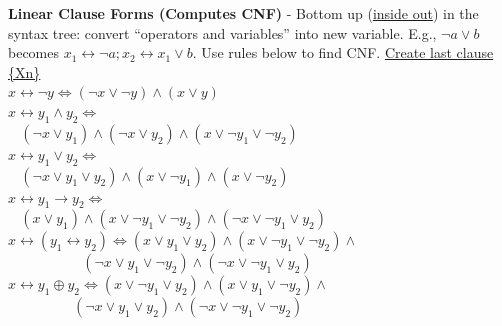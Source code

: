 \documentclass{article}
\begin{document}
\begin{multicols}{4}
\textbf{Linear Clause Forms (Computes CNF)} - Bottom up (\underline{inside out}) in the syntax tree: convert “operators and variables” into new variable.
E.g., $\neg a \vee b$ becomes $x_1 \leftrightarrow \neg a; x_2 \leftrightarrow x_1 \vee b$. Use rules below to find CNF. \underline{Create last clause \{Xn\}} \\
$x \leftrightarrow \neg y  \Leftrightarrow (\neg x \vee \neg y) \wedge (x \vee y)$ \\
$x \leftrightarrow y_1 \wedge y_2 \Leftrightarrow$ \\
$\ \ \ \ (\neg x \vee y_1) \wedge (\neg x \vee y_2) \wedge (x \vee \neg y_1 \vee \neg y_2)$ \\
$x \leftrightarrow y_1 \vee y_2 \Leftrightarrow$ \\
$\ \ \ \ (\neg x \vee y_1 \vee y_2) \wedge ( x \vee \neg y_1) \wedge (x \vee \neg y_2)$ \\
$x \leftrightarrow y_1 \rightarrow y_2 \Leftrightarrow$ \\
$\ \ \ \ (x \vee y_1) \wedge ( x \vee \neg y_1 \vee \neg y_2) \wedge (\neg x \vee \neg y_1 \vee y_2)$ \\
$x \leftrightarrow (y_1 \leftrightarrow y_2) \Leftrightarrow (x \vee y_1 \vee y_2) \wedge (x \vee \neg y_1 \vee \neg y_2) \wedge$ \\
$\ \ \ \ \ \ \ \ \ \ \ \ \ \ \ \ \ \ \ \ \ \ \ \ (\neg x \vee y_1 \vee \neg y_2) \wedge (\neg x \vee \neg y_1 \vee y_2)$\\
$x \leftrightarrow y_1 \oplus y_2 \Leftrightarrow (x \vee \neg y_1 \vee y_2) \wedge (x \vee y_1 \vee \neg y_2) \wedge$ \\
$\ \ \ \ \ \ \ \ \ \ \ \ \ \ \ \ \ \ \ \ \ (\neg x \vee y_1 \vee y_2) \wedge (\neg x \vee \neg y_1 \vee \neg y_2)$


\end{multicols}
\end{document}
